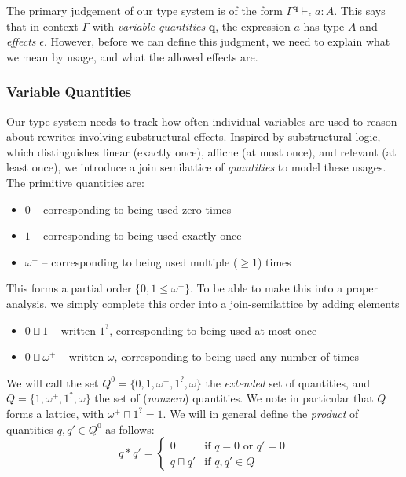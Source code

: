 \documentclass[acmsmall,screen,review]{acmart}
\newcommand{\mb}[1]{\ensuremath{\mathbf{#1}}}
\newcommand{\hasty}[4]{#1 \vdash_{#2} #3: {#4}}
\newcommand{\zeroq}{0}
\newcommand{\oneq}{1}
\newcommand{\delq}{1^?}
\newcommand{\cpyq}{\omega^+}
\newcommand{\topq}{\omega}
\begin{document}
The primary judgement of our type system is of the form $\hasty{\Gamma^{\mb{q}}}{\epsilon}{a}{A}$.
This says that in context $\Gamma$ with \emph{variable quantities} $\mb{q}$, the expression $a$ has
type $A$ and \emph{effects} $\epsilon$. However, before we can define this judgment, we need to
explain what we mean by usage, and what the allowed effects are. 


\subsubsection{Variable Quantities}
Our type system needs to track how often individual variables are used  to reason about rewrites
involving substructural effects. Inspired by substructural logic, which distinguishes linear
(exactly once), afficne (at most once), and relevant (at least once), we introduce a join
semilattice of \emph{quantities} to model these usages. The primitive quantities are:
\begin{itemize}
  \item $\zeroq$ -- corresponding to being used zero times
  \item $\oneq$ -- corresponding to being used exactly once
  \item $\cpyq$ -- corresponding to being used multiple ($\geq 1$) times
\end{itemize}
This forms a partial order $\{\zeroq, \oneq \leq \cpyq\}$. To be able to make this into a proper
analysis, we simply complete this order into a join-semilattice by adding elements
\begin{itemize}
  \item $\zeroq \sqcup \oneq$ -- written $\delq$, corresponding to being used at most once
  \item $\zeroq \sqcup \cpyq$ -- written $\topq$, corresponding to being used any number of times
\end{itemize}
We will call the set $Q^0 = \{\zeroq, \oneq, \cpyq, \delq, \topq\}$ the \emph{extended} set of
quantities, and $Q = \{\oneq, \cpyq, \delq, \topq\}$ the set of (\emph{nonzero}) quantities. We note
in particular that $Q$ forms a lattice, with $\cpyq \sqcap \delq = 1$. We will in general define the
\emph{product} of quantities $q, q' \in Q^0$ as follows:
\begin{equation}
  q * q' = \begin{cases}
    0 & \text{if } q = 0 \text{ or } q' = 0 \\
    q \sqcap q' & \text{if } q, q' \in Q
  \end{cases}
\end{equation}
\end{document}
